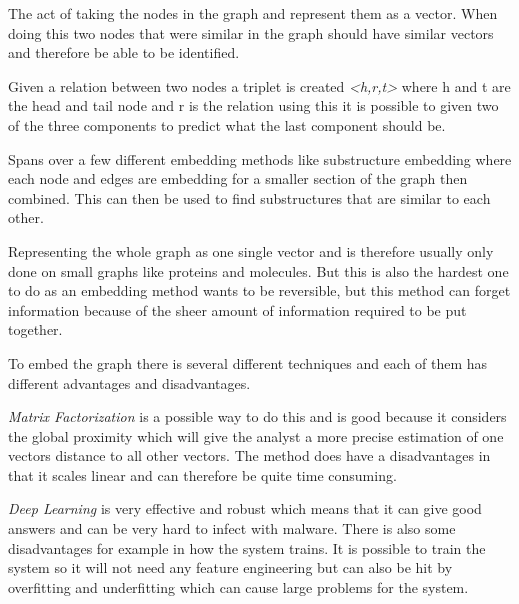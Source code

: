 \begin{definition} The act of taking the nodes in the graph and represent them as a vector. When doing this two nodes that were similar in the graph should have similar vectors and therefore be able to be identified.
\end{definition}

\begin{definition} Given a relation between two nodes a triplet is created \textit{<h,r,t>}  where h and t are the head and tail node and r is the relation using this it is possible to given two of the three components to predict what the last component should be.
\end{definition}

\begin{definition} Spans over a few different embedding methods like substructure embedding where each node and edges are embedding for a smaller section of the graph then combined. This can then be used to find substructures that are similar to each other.
\end{definition}

\begin{definition} Representing the whole graph as one single vector and is therefore usually only done on small graphs like proteins and molecules. But this is also the hardest one to do as an embedding method wants to be reversible, but this method can forget information because of the sheer amount of information required to be put together.
\end{definition}

To embed the graph there is several different techniques and each of them has different advantages and disadvantages.

\textit{Matrix Factorization} is a possible way to do this and is good because it considers the global proximity which will give the analyst a more precise estimation of one vectors distance to all other vectors. The method does have a disadvantages in that it scales linear and can therefore be quite time consuming.

\textit{Deep Learning} is very effective and robust which means that it can give good answers and can be very hard to infect with malware. There is also some disadvantages for example in how the system trains. It is possible to train the system so it will not need any feature engineering but can also be hit by overfitting and underfitting which can cause large problems for the system.

